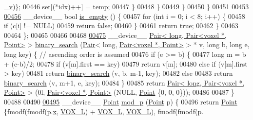 \begin{DoxyCode}
{      \hyperlink{classleaf_a4fc347dbd4f5911bbb477910588ed512}{\_v})\};
00446                     \textcolor{keyword}{set}[(*idx)++] = temp;
00447                 \}
00448             \}
00449         \}
00450     \}
00451 
00453 
\hypertarget{Voxel_8cuh_source.tex_l00456}{}\hyperlink{classvoxel_ae8d08bec6f007a905812764672327522}{00456}     \_\_device\_\_ \textcolor{keywordtype}{bool} \hyperlink{classvoxel_ae8d08bec6f007a905812764672327522}{is\_empty} () \{
00457         \textcolor{keywordflow}{for} (\textcolor{keywordtype}{int} i = 0; i < 8; i++) \{
00458             \textcolor{keywordflow}{if} (c[i] != NULL)
00459                 \textcolor{keywordflow}{return} \textcolor{keyword}{false};
00460         \}
00461         \textcolor{keywordflow}{return} \textcolor{keyword}{true};
00462     \}
00463 
00464 \};
00465 
00466 
00468 
\hypertarget{Voxel_8cuh_source.tex_l00475}{}\hyperlink{Voxel_8cuh_a8af940c50e32ce0514198b2bf835b80c}{00475} \_\_device\_\_ \hyperlink{classPair}{Pair< long, Pair<voxel *, Point>} > 
      \hyperlink{Voxel_8cuh_a8af940c50e32ce0514198b2bf835b80c}{binary\_search} (\hyperlink{classPair}{Pair}< \textcolor{keywordtype}{long}, \hyperlink{classPair}{Pair<voxel *, Point>} > * v, \textcolor{keywordtype}{long} b, \textcolor{keywordtype}{long} e,
       \textcolor{keywordtype}{long} key) \{ \textcolor{comment}{// ascending order is assumed}
00476     \textcolor{keywordflow}{if} (e >= b) \{
00477         \textcolor{keywordtype}{long} m = b + (e-b)/2;
00478         \textcolor{keywordflow}{if} (v[m].first == key)
00479             \textcolor{keywordflow}{return} v[m];
00480         \textcolor{keywordflow}{else} \textcolor{keywordflow}{if} (v[m].first > key)
00481             \textcolor{keywordflow}{return} \hyperlink{Voxel_8cuh_a8af940c50e32ce0514198b2bf835b80c}{binary\_search} (v, b, m-1, key);
00482         \textcolor{keywordflow}{else} 
00483             \textcolor{keywordflow}{return} \hyperlink{Voxel_8cuh_a8af940c50e32ce0514198b2bf835b80c}{binary\_search} (v, m+1, e, key);
00484     \}
00485     \textcolor{keywordflow}{return} \hyperlink{classPair}{Pair< long, Pair<voxel *, Point>} > (0l, 
      \hyperlink{classPair}{Pair<voxel *, Point>} (NULL, \hyperlink{structPoint}{Point} \{0, 0, 0\}));
00486 
00487 \}
00488 
00490 
\hypertarget{Voxel_8cuh_source.tex_l00495}{}\hyperlink{Voxel_8cuh_abbd51b1d8c2bc9b7d5ef5413e1e4ca49}{00495} \_\_device\_\_ \hyperlink{structPoint}{Point} \hyperlink{Voxel_8cuh_abbd51b1d8c2bc9b7d5ef5413e1e4ca49}{mod\_p} (\hyperlink{structPoint}{Point} p) \{
00496         \textcolor{keywordflow}{return} \hyperlink{structPoint}{Point} \{fmodf(fmodf(p.\hyperlink{structPoint_a05dfe2dfbde813ad234b514f30e662f1}{x}, \hyperlink{Voxel_8cuh_a3c1c8b966e30fa8ca2de07abe3b3d74a}{VOX\_L}) + \hyperlink{Voxel_8cuh_a3c1c8b966e30fa8ca2de07abe3b3d74a}{VOX\_L}, \hyperlink{Voxel_8cuh_a3c1c8b966e30fa8ca2de07abe3b3d74a}{VOX\_L}), fmodf(fmodf(p.
}
\end{DoxyCode}
